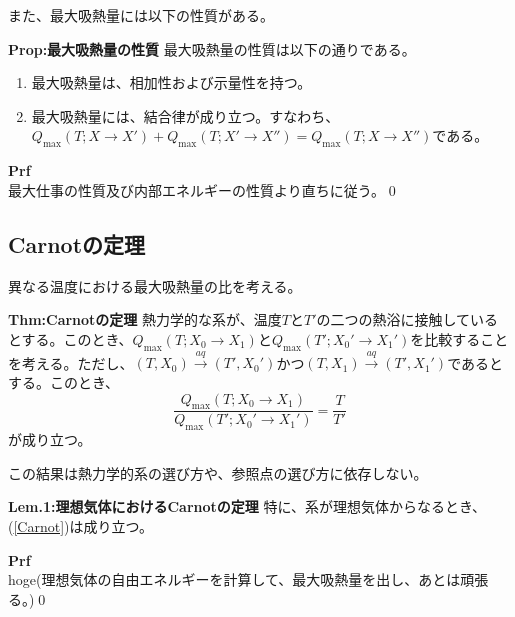 \documentclass[a4paper,11pt]{jsarticle}
\numberwithin{equation}{section}
\begin{document}
また、最大吸熱量には以下の性質がある。\\
\begin{itembox}[l]{\textbf{Prop:最大吸熱量の性質}}
    最大吸熱量の性質は以下の通りである。
    \begin{enumerate}
        \item 最大吸熱量は、相加性および示量性を持つ。
        \item 最大吸熱量には、結合律が成り立つ。すなわち、$Q_{\text{max}}(T;X\rightarrow X')+Q_{\text{max}}(T;X'\rightarrow X'') = Q_{\text{max}}(T;X\rightarrow X'')$である。
    \end{enumerate}
\end{itembox}
\textbf{Prf}\\
最大仕事の性質及び内部エネルギーの性質より直ちに従う。\qed\\

\subsection{Carnotの定理}
異なる温度における最大吸熱量の比を考える。\\
\begin{itembox}[l]{\textbf{Thm:Carnotの定理}}
    熱力学的な系が、温度$T$と$T'$の二つの熱浴に接触しているとする。このとき、$Q_{\text{max}}(T;X_0\rightarrow X_1)$と$Q_{\text{max}}(T';X_0'\rightarrow X_1')$を比較することを考える。ただし、$(T,X_0)\xrightarrow{aq}(T',X_0')$かつ$(T,X_1)\xrightarrow{aq}(T',X_1')$であるとする。このとき、
    \begin{equation}
        \frac{Q_{\text{max}}(T;X_0\rightarrow X_1)}{Q_{\text{max}}(T';X_0'\rightarrow X_1')} = \frac{T}{T'} \label{Carnot}
    \end{equation}
    が成り立つ。
\end{itembox} 
この結果は熱力学的系の選び方や、参照点の選び方に依存しない。\\

\begin{itembox}[l]{\textbf{Lem.1:理想気体におけるCarnotの定理}}
    特に、系が理想気体からなるとき、(\ref{Carnot})は成り立つ。
\end{itembox}
\textbf{Prf}\\
hoge(理想気体の自由エネルギーを計算して、最大吸熱量を出し、あとは頑張る。)\qed\\
\end{document}
